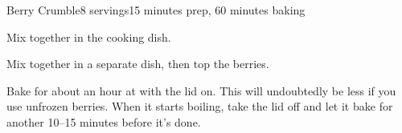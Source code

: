 \documentclass[../Cookbook.tex]{subfiles}
\begin{document}
\begin{recipe}{Berry Crumble}{8 servings}{15 minutes prep, 60 minutes baking}

	Mix together in the cooking dish.

	Mix together in a separate dish, then top the berries.

	\newstep
	Bake for about an hour at  with the lid on.
	This will undoubtedly be less if you use unfrozen berries.
	When it starts boiling, take the lid off and let it bake for another 10--15 minutes before it's done.


\end{recipe}
\end{document}
